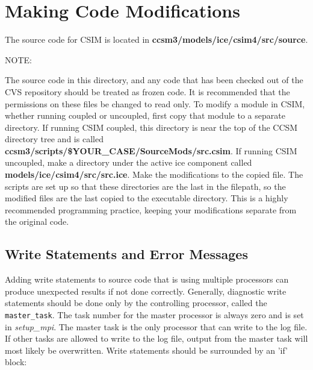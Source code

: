
\section {Making Code Modifications} 

The source code for CSIM is located in {\bf ccsm3/models/ice/csim4/src/source}.

\begin{Ventry}{NOTE:}
\item[NOTE]
      The source code in this directory, and any code that has been checked out of
      the CVS repository should be treated as frozen code.  It is recommended that
      the permissions on these files be changed to read only.  To modify a module
      in CSIM, whether running coupled or uncoupled, first copy that module to a 
      separate directory.  If running CSIM coupled, this directory is near the 
      top of the CCSM directory tree and is called 
      {\bf ccsm3/scripts/\$YOUR\_CASE/SourceMods/src.csim}.  If running CSIM uncoupled,
      make a directory under the active ice component called \\
      {\bf models/ice/csim4/src/src.ice}.
      Make the modifications to the copied file.  The scripts are set up so that
      these directories are the last in the filepath, so the modified files are the last
      copied to the executable directory.
      This is a highly recommended programming practice, keeping your modifications
      separate from the original code.
\end{Ventry}

\subsection {Write Statements and Error Messages}

Adding write statements to source code that is using multiple processors can
produce unexpected results if not done correctly.  Generally, diagnostic write statements
should be done only by the controlling processor, called the {\tt master\_task}.  The
task number for the master processor is always zero and is set in {\it setup\_mpi}. The
master task is the only processor that can write to the log file.  If other tasks are
allowed to write to the log file, output from the master task will most likely be overwritten.
Write statements should be surrounded by an 'if' block:

